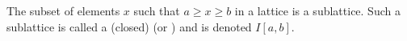 The subset of elements $x$ such that $a \geq x \geq b$ in a lattice is a sublattice. Such a sublattice is called a (closed)  (or ) and is denoted $I[a,b]$.
